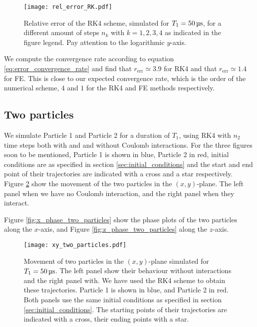\begin{figure}
    \texttt{[image: rel\_error\_RK.pdf]}
    \caption{Relative error of the RK4 scheme, simulated for $T_1=50\,\mus$, for a different amount of steps $n_k$ with $k=1,2,3,4$ as indicated in the figure legend. Pay attention to the logarithmic $y$-axis.}
    \label{fig:error_RK}
\end{figure}




We compute the convergence rate according to equation \eqref{eq:error_convergence_rate} and find that $r_\mathrm{err}\simeq 3.9 $ for RK4 and that $r_\mathrm{err}\simeq 1.4 $ for FE. This is close to our expected convergence rate, which is the order of the numerical scheme, $4$ and $1$ for the RK4 and FE methods respectively. 


\subsection{Two particles}\label{sec:two_particles}

We simulate Particle 1 and Particle 2 for a duration of $T_1$, using RK4 with $n_2$ time steps both with and and without Coulomb interactions. For the three figures soon to be mentioned, Particle 1 is shown in blue, Particle 2 in red, initial conditions are as specified in section \ref{sec:initial_conditions} and the start and end point of their trajectories are indicated with a cross and a star respectively. Figure \ref{fig:xy_two_particles} show the movement of the two particles in the $(x,y)$-plane. The left panel when we have no Coulomb interaction, and the right panel when they interact. 

Figure \ref{fig:x_phase_two_particles} show the phase plots of the two particles along the $x$-axis, and Figure \ref{fig:z_phase_two_particles} along the $z$-axis.
\newpage
\onecolumngrid


\begin{figure}
    \texttt{[image: xy\_two\_particles.pdf]}
    \caption{Movement of two particles in the $(x,y)$-plane simulated for $T_1=50\,\mus$. The left panel show their behaviour without interactions and the right panel with. We have used the RK4 scheme to obtain these trajectories. Particle 1 is shown in blue, and Particle 2 in red. Both panels use the same initial conditions as specified in section \ref{sec:initial_conditions}. The starting points of their trajectories are indicated with a cross, their ending points with a star.}
    \label{fig:xy_two_particles}
\end{figure}

